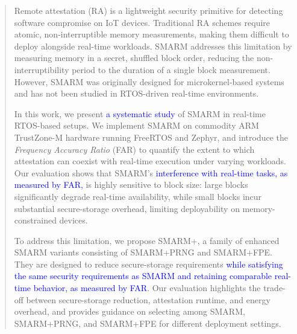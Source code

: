 \documentclass[journal]{IEEEtran}
\newcommand\ben[1]{\textcolor{blue}{#1}}
\begin{document}
\begin{abstract}
Remote attestation (RA) is a lightweight security primitive for detecting software compromise on IoT devices. Traditional RA schemes require atomic, non-interruptible memory measurements, making them difficult to deploy alongside real-time workloads. SMARM addresses this limitation by measuring memory in a secret, shuffled block order, reducing the non-interruptibility period to the duration of a single block measurement. However, SMARM was originally designed for microkernel-based systems and has not been studied in RTOS-driven real-time environments.



In this work, we present \ben{a systematic study} of SMARM in real-time RTOS-based setups. We implement SMARM on commodity ARM TrustZone-M hardware running FreeRTOS and Zephyr, and introduce the \emph{Frequency Accuracy Ratio} (FAR) to quantify the extent to which attestation can coexist with real-time execution under varying workloads. Our evaluation shows that SMARM’s \ben{interference with real-time tasks, as measured by FAR,} is highly sensitive to block size: large blocks significantly degrade real-time availability, while small blocks incur substantial secure-storage overhead, limiting deployability on memory-constrained devices.

To address this limitation, we propose SMARM+, a family of enhanced SMARM variants consisting of SMARM+PRNG and SMARM+FPE. They are designed to reduce secure-storage requirements \ben{while satisfying the same security requirements as SMARM and retaining comparable real-time behavior, as measured by FAR}. Our evaluation highlights the trade-off between secure-storage reduction, attestation runtime, and energy overhead, and provides guidance on selecting among SMARM, SMARM+PRNG, and SMARM+FPE for different deployment settings.


\end{abstract}
\end{document}
